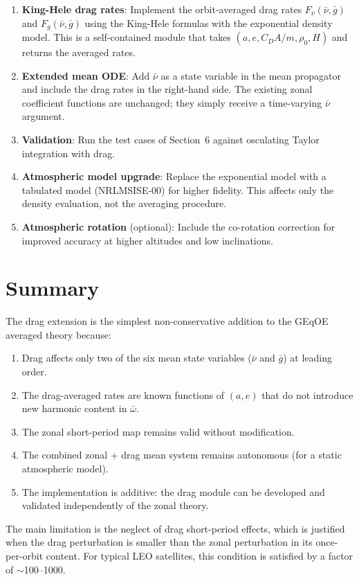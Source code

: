 \documentclass[11pt]{article}
\begin{document}
\begin{enumerate}
\item \textbf{King-Hele drag rates}: Implement the orbit-averaged drag rates
$F_\nu(\bar\nu, \bar g)$ and $F_g(\bar\nu, \bar g)$ using the King-Hele
formulas with the exponential density model. This is a self-contained
module that takes $(a, e, C_D A/m, \rho_0, H)$ and returns the averaged
rates.

\item \textbf{Extended mean ODE}: Add $\bar\nu$ as a state variable in the
mean propagator and include the drag rates in the right-hand side. The
existing zonal coefficient functions are unchanged; they simply receive a
time-varying $\bar\nu$ argument.

\item \textbf{Validation}: Run the test cases of Section~6 against
osculating Taylor integration with drag.

\item \textbf{Atmospheric model upgrade}: Replace the exponential model
with a tabulated model (NRLMSISE-00) for higher fidelity. This affects only
the density evaluation, not the averaging procedure.

\item \textbf{Atmospheric rotation} (optional): Include the co-rotation
correction for improved accuracy at higher altitudes and low inclinations.
\end{enumerate}


\section{Summary}

The drag extension is the simplest non-conservative addition to the GEqOE
averaged theory because:
\begin{enumerate}
\item Drag affects only two of the six mean state variables ($\bar\nu$
and $\bar g$) at leading order.
\item The drag-averaged rates are known functions of $(a, e)$ that do not
introduce new harmonic content in $\bar\omega$.
\item The zonal short-period map remains valid without modification.
\item The combined zonal + drag mean system remains autonomous (for a
static atmospheric model).
\item The implementation is additive: the drag module can be developed and
validated independently of the zonal theory.
\end{enumerate}

The main limitation is the neglect of drag short-period effects, which is
justified when the drag perturbation is smaller than the zonal perturbation
in its once-per-orbit content. For typical LEO satellites, this condition
is satisfied by a factor of $\sim$100--1000.
\end{document}
